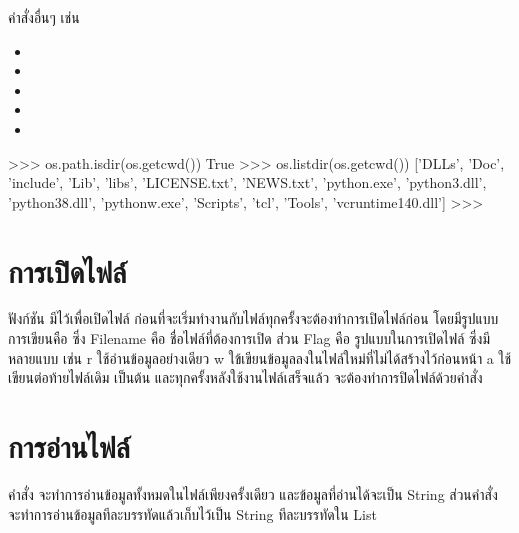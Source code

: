 คำสั่งอื่นๆ เช่น 

\begin{itemize}
\item 	{}
\item 	{} 
\item 	{} 
\item 	{} 
\item 	{}
\end{itemize}

\begin{codelist}{}{}
>>> os.path.isdir(os.getcwd())
True
>>> os.listdir(os.getcwd())
['DLLs', 'Doc', 'include', 'Lib', 'libs', 'LICENSE.txt', 'NEWS.txt', 'python.exe', 'python3.dll', 'python38.dll', 'pythonw.exe', 'Scripts', 'tcl', 'Tools', 'vcruntime140.dll']
>>>
\end{codelist}


\section{การเปิดไฟล์}

ฟังก์ชัน มีไว้เพื่อเปิดไฟล์ ก่อนที่จะเริ่มทำงานกับไฟล์ทุกครั้งจะต้องทำการเปิดไฟล์ก่อน โดยมีรูปแบบการเขียนคือ  ซึ่ง Filename คือ ชื่อไฟล์ที่ต้องการเปิด ส่วน Flag คือ รูปแบบในการเปิดไฟล์ ซึ่งมีหลายแบบ เช่น r ใช้อ่านข้อมูลอย่างเดียว w ใข้เขียนข้อมูลลงในไฟล์ใหม่ที่ไม่ได้สร้างไว้ก่อนหน้า a ใช้เขียนต่อท้ายไฟล์เดิม เป็นต้น และทุกครั้งหลังใช้งานไฟล์เสร็จแล้ว จะต้องทำการปิดไฟล์ด้วยคำสั่ง 

\begin{codelist}{}{}

\end{codelist}


\section{การอ่านไฟล์}

คำสั่ง  จะทำการอ่านข้อมูลทั้งหมดในไฟล์เพียงครั้งเดียว และข้อมูลที่อ่านได้จะเป็น String ส่วนคำสั่ง  จะทำการอ่านข้อมูลทีละบรรทัดแล้วเก็บไว้เป็น String ทีละบรรทัดใน List

